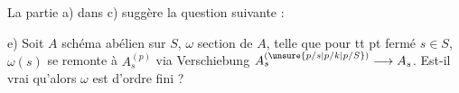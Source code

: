 
La partie a) dans c) suggère la question suivante :

e) Soit $A$ schéma abélien sur $S$, $\omega$ section de $A$, telle que pour tt pt fermé $s\in S$, $\omega(s)$ se remonte à $A_s^{(p)}$ via Verschiebung $A_s^{(\unsure{p/s|p/k|p/S})}\longrightarrow A_s$. Est-il vrai qu'alors $\omega$ est d'ordre fini ?



